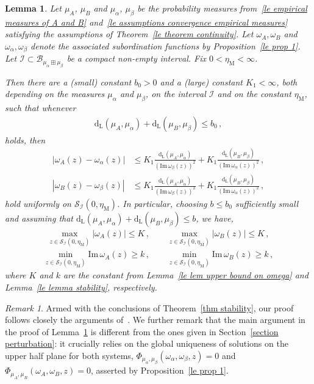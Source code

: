 \documentclass[10pt,reqno]{amsart}
\numberwithin{equation}{section}
\theoremstyle{plain}
\newtheorem{lemma}[theorem]{Lemma}
\newcounter{kevin}
\numberwithin{kevin}{section}
\theoremstyle{remark}
\newtheorem{remark}[kevin]{Remark}
\renewcommand{\Im}{\mathrm{Im}\,}
\newcommand{\im}{\mathrm{Im}\,}
\newcommand{\PP}{\Phi}
\newcommand{\dL}{\mathrm{d}_{\mathrm{L}}}
\begin{document}
\begin{lemma} \label{cor.080601}
 Let $\mu_A$, $\mu_B$ and $\mu_\alpha$, $\mu_\beta$ be the probability measures from~\eqref{le empirical measures of A and B} and~\eqref{le assumptions convergence empirical measures} satisfying the assumptions of Theorem~\ref{le theorem continuity}. Let $\omega_A,\omega_B$ and $\omega_\alpha,\omega_\beta$ denote the associated subordination functions by Proposition~\ref{le prop 1}. Let $\mathcal{I}\subset\mathcal{B}_{\mu_\alpha\boxplus\mu_\beta}$ be a compact non-empty interval.  Fix $0<\eta_{\mathrm{M}}<\infty$. 
 
 Then there are a (small) constant $b_0>0$ and a (large) constant $K_1<\infty$, both depending on the measures $\mu_\alpha$ and $\mu_\beta$, on the interval $\mathcal{I}$ and on the constant $\eta_{\mathrm{M}}$, such that whenever
 \begin{align}
  \dL(\mu_A,\mu_\alpha)+\dL(\mu_B,\mu_\beta)\le b_0\,,
 \end{align}
holds, then
 \begin{align}\label{le estimate for the deterministic guys}
  |\omega_{A}(z)-\omega_\alpha(z)|&\le K_1\frac{\dL(\mu_A,\mu_\alpha)}{(\Im\omega_\beta(z))^2}+K_1\frac{\dL(\mu_B,\mu_\beta)}{(\im \omega_\alpha(z))^2}\,,\nonumber\\ |\omega_B(z)-\omega_\beta(z)|&\le K_1\frac{\dL(\mu_A,\mu_\alpha)}{(\Im\omega_\beta(z))^2}+K_1\frac{\dL(\mu_B,\mu_\beta)}{(\im \omega_\alpha(z))^2}\,,
 \end{align}
hold uniformly on $\mathcal{S}_{\mathcal{I}}(0,\eta_{\mathrm{M}})$. In particular, choosing $b\le b_0$ sufficiently small and assuming that $\dL(\mu_A,\mu_\alpha)+\dL(\mu_B,\mu_\beta)\le b $, we have, 
 \begin{align}\label{le upper bound on omega AB}
  \max_{z\in\mathcal{S}_{\mathcal{I}}(0,\eta_{\mathrm{M}})}|\omega_A(z)|\le K\,,\qquad  \max_{z\in\mathcal{S}_{\mathcal{I}}(0,\eta_{\mathrm{M}})}|\omega_B(z)|\le K\,,
 \end{align}
 \begin{align}\label{le lower bound on omega AB}
 \min_{z\in\mathcal{S}_{\mathcal{I}}(0,\eta_{\mathrm{M}})}\im\omega_A(z)\ge k\,,\qquad  \min_{z\in\mathcal{S}_{\mathcal{I}}(0,\eta_{\mathrm{M}})}\im\omega_B(z)\ge k\,,
 \end{align}
 where $K$ and $k$ are the constant from Lemma~\ref{le lem upper bound on omega} and Lemma~\ref{le lemma stability}, respectively.


\end{lemma}
\begin{remark}Armed with the conclusions of Theorem~\ref{thm stability}, our proof follows closely the arguments of~\cite{Kargin2013}. We further remark that the main argument in the proof of Lemma~\ref{cor.080601} is different from the ones given in Section~\ref{section perturbation}: it crucially relies on the global uniqueness of solutions on the upper half plane for both systems, $\PP_{\mu_\alpha,\mu_\beta}(\omega_\alpha,\omega_\beta,z)=0$ and $\PP_{\mu_A,\mu_B}(\omega_A,\omega_B,z)=0$, asserted by Proposition~\ref{le prop 1}.
\end{remark}
\end{document}
